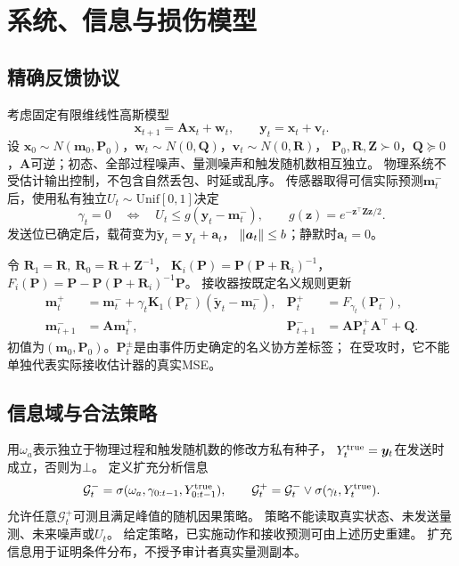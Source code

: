 \section{系统、信息与损伤模型}
\subsection{精确反馈协议}
考虑固定有限维线性高斯模型
\begin{equation}
{\bm{x}}_{t+1}={\bm{A}}{\bm{x}}_t+{\bm{w}}_t,\qquad {\bm{y}}_t={\bm{x}}_t+{\bm{v}}_t .
\label{eq:model}
\end{equation}
设 ${\bm{x}}_0\sim N({\bm{m}}_0,{\bm{P}}_0)$，${\bm{w}}_t\sim N(0,{\bm{Q}})$，${\bm{v}}_t\sim N(0,{\bm{R}})$，
${\bm{P}}_0,{\bm{R}},{\bm{Z}}\succ0$，${\bm{Q}}\succeq0$，${\bm{A}}$可逆；初态、全部过程噪声、量测噪声和触发随机数相互独立。
物理系统不受估计输出控制，不包含自然丢包、时延或乱序。
传感器取得可信实际预测${\bm{m}}_t^-$后，使用私有独立$U_t\sim\mathrm{Unif}[0,1]$决定
\begin{equation}
\gamma_t=0\quad\Longleftrightarrow\quad
U_t\le g({\bm{y}}_t-{\bm{m}}_t^-),\qquad g({\bm{z}})=e^{-{\bm{z}}^\top {\bm{Z}}{\bm{z}}/2}.
\label{eq:trigger}
\end{equation}
发送位已确定后，载荷变为$\tilde {\bm{y}}_t={\bm{y}}_t+{\bm{a}}_t$，
$\left\|{\bm{a}}_t\right\|\le b$；静默时${\bm{a}}_t=0$。

令 ${\bm{R}}_1={\bm{R}},\ {\bm{R}}_0={\bm{R}}+{\bm{Z}}^{-1}$，
${\bm{K}}_i({\bm{P}})={\bm{P}}({\bm{P}}+{\bm{R}}_i)^{-1}$，$F_i({\bm{P}})={\bm{P}}-{\bm{P}}({\bm{P}}+{\bm{R}}_i)^{-1}{\bm{P}}$。
接收器按既定名义规则更新
\begin{align}
{\bm{m}}_t^+&={\bm{m}}_t^-+\gamma_t{\bm{K}}_1({\bm{P}}_t^-)(\tilde {\bm{y}}_t-{\bm{m}}_t^-),&
{\bm{P}}_t^+&=F_{\gamma_t}({\bm{P}}_t^-),\label{eq:receive}\\
{\bm{m}}_{t+1}^-&={\bm{A}}{\bm{m}}_t^+,& {\bm{P}}_{t+1}^-&={\bm{A}}{\bm{P}}_t^+{\bm{A}}^\top+{\bm{Q}}.\nonumber
\end{align}
初值为$({\bm{m}}_0,{\bm{P}}_0)$。${\bm{P}}_t^\pm$是由事件历史确定的名义协方差标签；
在受攻时，它不能单独代表实际接收估计器的真实MSE。

\subsection{信息域与合法策略}
用$\omega_a$表示独立于物理过程和触发随机数的修改方私有种子，
$Y_t^{\rm true}={\bm{y}}_t$在发送时成立，否则为$\bot$。
定义扩充分析信息
\[
\mathcal G_t^-=\sigma(\omega_a,\gamma_{0:t-1},Y^{\rm true}_{0:t-1}),\qquad
\mathcal G_t^+=\mathcal G_t^-\vee\sigma(\gamma_t,Y_t^{\rm true}).
\]
允许任意$\mathcal G_t^+$可测且满足峰值的随机因果策略。
策略不能读取真实状态、未发送量测、未来噪声或$U_t$。
给定策略，已实施动作和接收预测可由上述历史重建。
扩充信息用于证明条件分布，不授予审计者真实量测副本。


